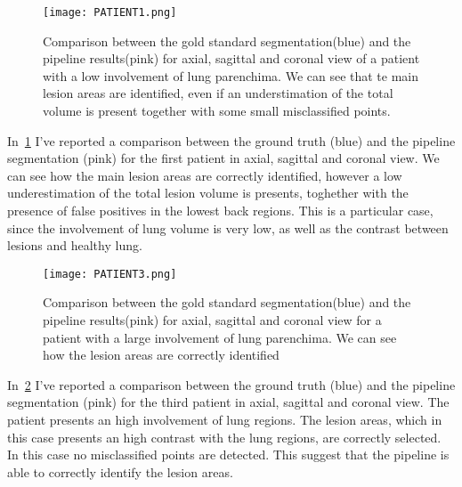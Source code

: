 \documentclass{standalone}
\begin{document}
	\begin{figure}[h!]
		\centering
		\texttt{[image: PATIENT1.png]}  
		\caption{Comparison between the gold standard segmentation(blue) and the pipeline results(pink) for axial, sagittal and coronal view of a patient with a low involvement of lung parenchima. We can see that te main lesion areas are identified, even if an understimation of the total volume is present together with some small misclassified points.}\label{fig:pat1}
	\end{figure}
	
 	In \figurename\,\ref{fig:pat1} I've reported a comparison between the ground truth (blue) and the pipeline segmentation (pink) for the first patient in axial, sagittal and coronal view. We can see how the main lesion areas are correctly identified, however a low underestimation of the total lesion volume is presents, toghether with the presence of false positives in the lowest back regions. This is a particular case, since the involvement of lung volume is very low, as well as the contrast between lesions and healthy lung.
 	
 	
 	\begin{figure}
 		\centering
 		\texttt{[image: PATIENT3.png]}  
 		\caption{Comparison between the gold standard segmentation(blue) and the pipeline results(pink) for axial, sagittal and coronal view for a patient with a large involvement of lung parenchima. We can see how the lesion areas are correctly identified}\label{fig:pat3}
 	\end{figure}
 	
 	
 
 	
 	In \figurename\,\ref{fig:pat3} I've reported a comparison between the ground truth (blue) and the pipeline segmentation (pink) for the third patient in axial, sagittal and coronal view. The patient presents an high involvement of lung regions.  The lesion areas, which  in this case presents an high contrast with the lung regions, are correctly selected. In this case no misclassified points are detected. This suggest that the pipeline is able to correctly identify the lesion areas. 
 	
 	
	
\end{document}
